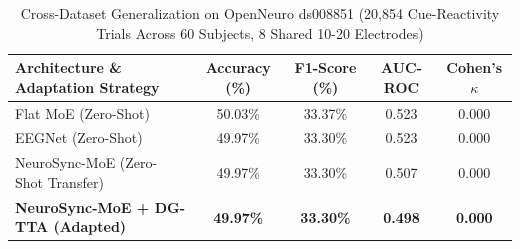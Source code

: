 \begin{table}[t]
\centering
\caption{Cross-Dataset Generalization on OpenNeuro ds008851 (20,854 Cue-Reactivity Trials Across 60 Subjects, 8 Shared 10-20 Electrodes)}
\label{tab:cross_dataset}
\begin{tabular}{lcccc}
\hline
\textbf{Architecture \& Adaptation Strategy} & \textbf{Accuracy (\%)} & \textbf{F1-Score (\%)} & \textbf{AUC-ROC} & \textbf{Cohen's $\kappa$} \\
\hline
Flat MoE (Zero-Shot) & 50.03\% & 33.37\% & 0.523 & 0.000 \\
EEGNet (Zero-Shot) & 49.97\% & 33.30\% & 0.523 & 0.000 \\
NeuroSync-MoE (Zero-Shot Transfer) & 49.97\% & 33.30\% & 0.507 & 0.000 \\
\textbf{NeuroSync-MoE + DG-TTA (Adapted)} & \textbf{49.97\%} & \textbf{33.30\%} & \textbf{0.498} & \textbf{0.000} \\
\hline
\end{tabular}
\end{table}